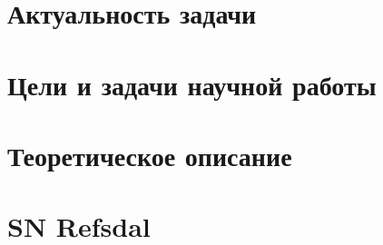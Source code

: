 % 
    
    \section{Актуальность задачи}
        
    
    \section{Цели и задачи научной работы}
        
    
    \section{Теоретическое описание}
   
        
   
    \section{SN Refsdal}
        
   
   